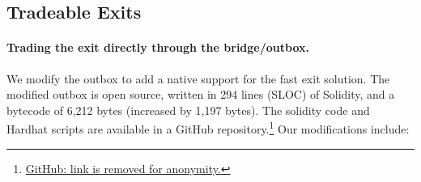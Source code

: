 \subsection{Tradeable Exits}

\paragraph{Trading the exit directly through the bridge/outbox.} We modify the \arb \nitro outbox to add a native support for the fast exit solution. The modified outbox is open source, written in 294 lines (SLOC) of Solidity, and a bytecode of 6,212 bytes (increased by 1,197 bytes). The solidity code and Hardhat scripts are available in a GitHub repository.\footnote{\href{https://}{GitHub: link is removed for anonymity.}} Our modifications include:

